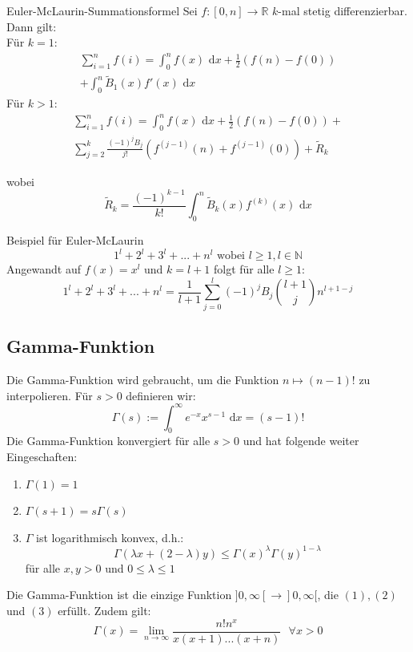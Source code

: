 \documentclass[a4paper,fontsize = 7pt]{scrartcl}
\def\limn{\lim_{n\to \infty}}
\def\R{\mathbb{R}}
\def\dx{\text{ d}x}
\begin{document}
\begin{mainbox}{Euler-McLaurin-Summationsformel}
  \vspace{-4pt}
  Sei $f: [0, n] \to \R$ $k$-mal stetig differenzierbar. Dann gilt: \\
  Für $k = 1$:
  \begin{align*}
  \sum_{i = 1}^n f(i) = \int_0^n f(x) \dx + \frac{1}{2}(f(n) - f(0)) \\ + \int_0^n \tilde{B}_1(x)f'(x)\dx
  \end{align*}
  Für $k>1$:
  \begin{align*}
  \sum_{i = 1}^n f(i) = \int_0^n f(x) \dx + \frac{1}{2}(f(n) - f(0))+ \\
  \sum_{j = 2}^k \frac{(-1)^j B_j}{j!}(f^{(j-1)}(n) + f^{(j-1)}(0)) + \tilde{R}_k
  \end{align*}
  
  wobei
  $$ \tilde{R}_k = \frac{(-1)^{k-1}}{k!} \int_0^n \tilde{B}_k(x)f^{(k)}(x)\dx$$
  \vspace{-12pt}
\end{mainbox}

\begin{subbox}{Beispiel für Euler-McLaurin}
  \vspace{-12pt}
  $$1^l + 2^l + 3^l + ... + n^l \text{ wobei } l \geq 1, l \in \mathbb{N}$$
  Angewandt auf $f(x) = x^l$ und $k = l + 1$ folgt für alle $l \geq 1$:
  $$1^l + 2^l + 3^l + ... + n^l = \frac{1}{l + 1} \sum_{j = 0}^l (-1)^j B_j {l + 1 \choose j} n^{l+1-j}$$
  \vspace{-8pt}
\end{subbox}

\subsection{Gamma-Funktion}
Die Gamma-Funktion wird gebraucht, um die Funktion $n \mapsto (n-1)!$ zu interpolieren. Für $s > 0$ definieren wir: $$\Gamma(s) := \int_0^\infty e^{-x}x^{s-1}\dx = (s-1)!$$
Die Gamma-Funktion konvergiert für alle $s > 0$ und hat folgende weiter Eingeschaften:
\begin{enumerate}
  \item $\Gamma(1) = 1$
  \item $\Gamma(s + 1) = s \Gamma(s)$
  \item $\Gamma$ ist logarithmisch konvex, d.h.: $$\Gamma(\lambda x + (2 - \lambda)y) \leq \Gamma(x)^\lambda \Gamma(y)^{1 - \lambda}$$ für alle $x, y > 0$ und $0 \leq \lambda \leq 1$
\end{enumerate}
Die Gamma-Funktion ist die einzige Funktion $]0, \infty[ \to ]0, \infty[$, die $(1), (2)$ und $(3)$ erfüllt. Zudem gilt: $$\Gamma(x) = \limn \frac{n!n^x}{x(x+1)...(x+n)} \ \ \ \forall x > 0$$
\end{document}
